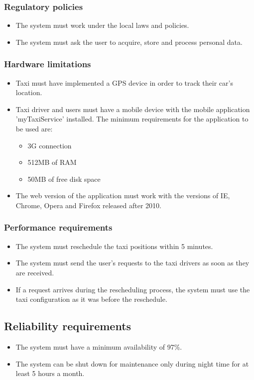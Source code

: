 \subsubsection{Regulatory policies}
	\begin{itemize}
		\item The system must work under the local laws and policies.
		\item The system must ask the user to acquire, store and process personal data. 
	\end{itemize}
	
\subsubsection{Hardware limitations}
	\begin{itemize}
		\item Taxi must have implemented a GPS device in order to track their car's location.
		\item Taxi driver and users must have a mobile device with the mobile application 'myTaxiService' installed. The minimum requirements for the application to be used are: 
		\begin{itemize}
			\item 3G connection
			\item 512MB of RAM
			\item 50MB of free disk space
		\end{itemize}
		\item The web version of the application must work with the versions of IE, Chrome, Opera and Firefox released after 2010.
	\end{itemize}

\subsubsection{Performance requirements}
	\begin{itemize}
		\item The system must reschedule the taxi positions within 5 minutes.
		\item The system must send the user's requests to the taxi drivers as soon as they are received.
		\item If a request arrives during the rescheduling process, the system must use the taxi configuration as it was before the reschedule.
	\end{itemize}

\subsection{Reliability requirements}
	\begin{itemize}
		\item The system must have a minimum availability of 97\%.
		\item The system can be shut down for maintenance only during night time for at least 5 hours a month.
	\end{itemize}

